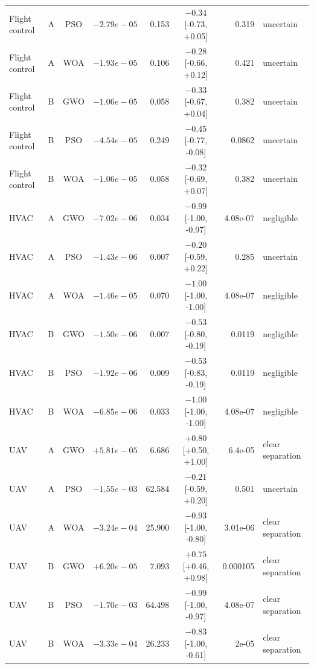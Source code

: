 \begin{table}[htbp]
{\begin{tabular}{@{}llcrrcrl@{}}
Flight control & A & PSO & $-2.79e-05$ & 0.153 & $-0.34$ [-0.73, +0.05] & 0.319 & uncertain \\
Flight control & A & WOA & $-1.93e-05$ & 0.106 & $-0.28$ [-0.66, +0.12] & 0.421 & uncertain \\
Flight control & B & GWO & $-1.06e-05$ & 0.058 & $-0.33$ [-0.67, +0.04] & 0.382 & uncertain \\
Flight control & B & PSO & $-4.54e-05$ & 0.249 & $-0.45$ [-0.77, -0.08] & 0.0862 & uncertain \\
Flight control & B & WOA & $-1.06e-05$ & 0.058 & $-0.32$ [-0.69, +0.07] & 0.382 & uncertain \\
\addlinespace
HVAC & A & GWO & $-7.02e-06$ & 0.034 & $-0.99$ [-1.00, -0.97] & 4.08e-07 & negligible \\
HVAC & A & PSO & $-1.43e-06$ & 0.007 & $-0.20$ [-0.59, +0.22] & 0.285 & uncertain \\
HVAC & A & WOA & $-1.46e-05$ & 0.070 & $-1.00$ [-1.00, -1.00] & 4.08e-07 & negligible \\
HVAC & B & GWO & $-1.50e-06$ & 0.007 & $-0.53$ [-0.80, -0.19] & 0.0119 & negligible \\
HVAC & B & PSO & $-1.92e-06$ & 0.009 & $-0.53$ [-0.83, -0.19] & 0.0119 & negligible \\
HVAC & B & WOA & $-6.85e-06$ & 0.033 & $-1.00$ [-1.00, -1.00] & 4.08e-07 & negligible \\
\addlinespace
UAV & A & GWO & $+5.81e-05$ & 6.686 & $+0.80$ [+0.50, +1.00] & 6.4e-05 & clear separation \\
UAV & A & PSO & $-1.55e-03$ & 62.584 & $-0.21$ [-0.59, +0.20] & 0.501 & uncertain \\
UAV & A & WOA & $-3.24e-04$ & 25.900 & $-0.93$ [-1.00, -0.80] & 3.01e-06 & clear separation \\
UAV & B & GWO & $+6.20e-05$ & 7.093 & $+0.75$ [+0.46, +0.98] & 0.000105 & clear separation \\
UAV & B & PSO & $-1.70e-03$ & 64.498 & $-0.99$ [-1.00, -0.97] & 4.08e-07 & clear separation \\
UAV & B & WOA & $-3.33e-04$ & 26.233 & $-0.83$ [-1.00, -0.61] & 2e-05 & clear separation \\
\bottomrule
\end{tabular}}
\end{table}
